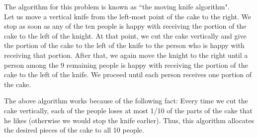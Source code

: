\begin{solution}
	The algorithm for this problem is known as ``the moving knife algorithm".\\[0.2cm]
	
	Let us move a vertical knife from the left-most point of the cake to the right. We stop as soon as any of the ten people is happy with receiving the portion of the cake to the left of the knight. At that point, we cut the cake vertically and give the portion of the cake to the left of the knife to the person who is happy with receiving that portion. After that, we again move the knight to the right until a person among the 9 remaining people is happy with receiving the portion of the cake to the left of the knife. We proceed until each person receives one portion of the cake.
	
	The above algorithm works because of the following fact: Every time we cut the cake vertically, each of the people loses at most 1/10 of the parts of the cake that he likes (otherwise we would stop the knife earlier). Thus, this algorithm allocates the desired pieces of the cake to all 10 people.
\end{solution}
